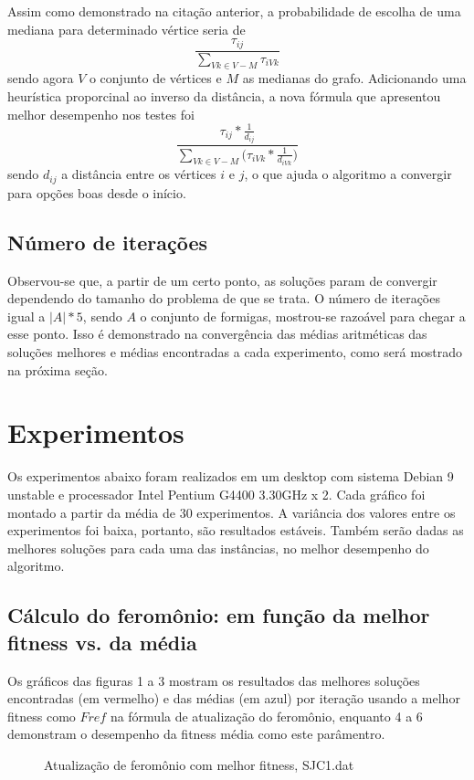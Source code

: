 \documentclass[11pt]{article}
\begin{document}
Assim como demonstrado na citação anterior, a probabilidade de escolha de uma mediana para determinado vértice seria de $$\frac{\tau_{ij}}{\sum_{Vk \in V - M}{\tau_{iVk}}}$$ sendo agora $V$ o conjunto de vértices e $M$ as medianas do grafo. Adicionando uma heurística proporcinal ao inverso da distância, a nova fórmula que apresentou melhor desempenho nos testes foi $$\frac{\tau_{ij} * \frac{1}{d_{ij}}}{\sum_{Vk \in V - M}{(\tau_{iVk} * \frac{1}{d_{iVk}}})}$$ sendo $d_{ij}$ a distância entre os vértices $i$ e $j$, o que ajuda o algoritmo a convergir para opções boas desde o início.

\subsection*{Número de iterações}

Observou-se que, a partir de um certo ponto, as soluções param de convergir dependendo do tamanho do problema de que se trata. O número de iterações igual a $|A| * 5$, sendo $A$ o conjunto de formigas, mostrou-se razoável para chegar a esse ponto. Isso é demonstrado na convergência das médias aritméticas das soluções melhores e médias encontradas a cada experimento, como será mostrado na próxima seção.

\section{Experimentos}

Os experimentos abaixo foram realizados em um desktop com sistema Debian 9 unstable e processador Intel Pentium G4400 3.30GHz x 2. Cada gráfico foi montado a partir da média de 30 experimentos. A variância dos valores entre os experimentos foi baixa, portanto, são resultados estáveis. Também serão dadas as melhores soluções para cada uma das instâncias, no melhor desempenho do algoritmo.

\subsection{Cálculo do feromônio: em função da melhor fitness vs. da média}

Os gráficos das figuras 1 a 3 mostram os resultados das melhores soluções encontradas (em vermelho) e das médias (em azul) por iteração usando a melhor fitness como $F{ref}$ na fórmula de atualização do feromônio, enquanto 4 a 6 demonstram o desempenho da fitness média como este parâmentro.

\begin{figure}[!ht]
	\centering
    \caption{Atualização de feromônio com melhor fitness, SJC1.dat}
    \label{fig:data}
\end{figure}
\end{document}
